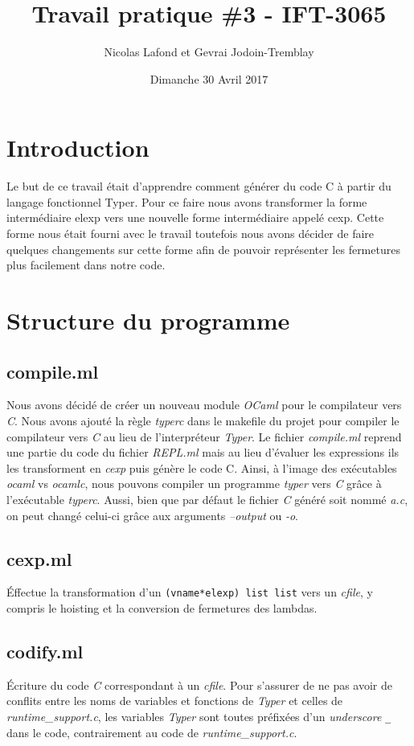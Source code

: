 \documentclass{article}
\begin{document}
\title{Travail pratique \#3 - IFT-3065}
\author{Nicolas Lafond et Gevrai Jodoin-Tremblay}
\date{Dimanche 30 Avril 2017}
\maketitle

\section{Introduction}
Le but de ce travail était d'apprendre comment générer du code C à partir du 
langage fonctionnel Typer. Pour ce faire nous avons transformer la forme
intermédiaire elexp vers une nouvelle forme intermédiaire appelé cexp. Cette
forme nous était fourni avec le travail toutefois nous avons décider de faire
quelques changements sur cette forme afin de pouvoir représenter les fermetures
plus facilement dans notre code.

\section{Structure du programme}
\subsection{compile.ml}
Nous avons décidé de créer un nouveau module \emph{OCaml} pour le compilateur
vers \emph{C}.
Nous avons ajouté la règle \emph{typerc} dans le makefile du projet pour compiler
le compilateur vers \emph{C} au lieu de l'interpréteur \emph{Typer}. Le fichier
\emph{compile.ml}
reprend une partie du code du fichier \emph{REPL.ml} mais au lieu d'évaluer
les expressions ils les transforment en \emph{cexp} puis génère le code C. Ainsi,
à l'image des exécutables \emph{ocaml} vs \emph{ocamlc}, nous pouvons compiler
un programme \emph{typer} vers \emph{C} grâce à l'exécutable \emph{typerc}.
Aussi, bien que par défaut le fichier \emph{C} généré soit nommé \emph{a.c},
on peut changé celui-ci grâce aux arguments \emph{--output} ou \emph{-o}.

\subsection{cexp.ml}
Éffectue la transformation d'un \texttt{(vname*elexp) list list} vers un
\emph{cfile}, y compris le hoisting et la conversion de fermetures des lambdas.

\subsection{codify.ml}
Écriture du code \emph{C} correspondant à un \emph{cfile}. Pour s'assurer de ne
pas avoir de conflits entre les noms de variables et fonctions de \emph{Typer}
et celles de \emph{runtime\_support.c}, les variables \emph{Typer} sont toutes
préfixées d'un \emph{underscore} \texttt{\_} dans le code, contrairement au code
de \emph{runtime\_support.c}.
\end{document}
